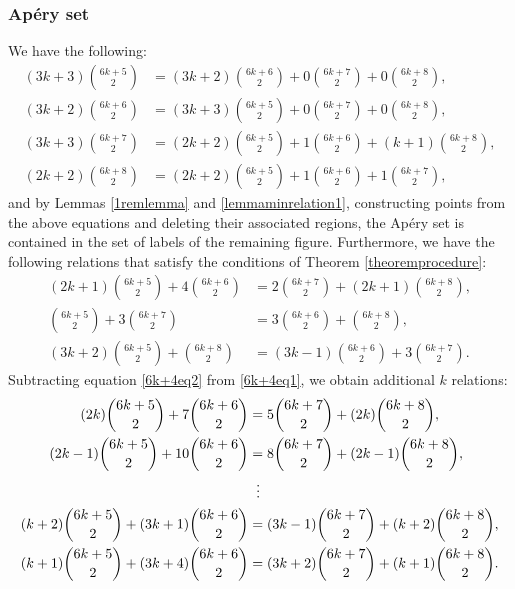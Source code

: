 \documentclass[12pt]{article}
\theoremstyle{remark}
\begin{document}
\subsubsection{Ap{\'e}ry set}
We have the following:
\begin{align}
    (3k+3)\binom{6k+5}{2} &= (3k+2)\binom{6k+6}{2} + 0\binom{6k+7}{2} + 0\binom{6k+8}{2}, \label{6k+4minrelation0} \\
    (3k+2)\binom{6k+6}{2} &= (3k+3)\binom{6k+5}{2} + 0\binom{6k+7}{2} + 0\binom{6k+8}{2}, \label{6k+4minrelation1} \\
    (3k+3)\binom{6k+7}{2} &= (2k+2)\binom{6k+5}{2} + 1\binom{6k+6}{2} + (k+1)\binom{6k+8}{2}, \label{6k+4minrelation2} \\
    (2k+2)\binom{6k+8}{2} &= (2k+2)\binom{6k+5}{2} + 1\binom{6k+6}{2} + 1\binom{6k+7}{2}, \label{6k+4minrelation3} 
\end{align}
and by Lemmas \ref{1remlemma} and \ref{lemmaminrelation1}, constructing points from the above equations and deleting their associated regions, the Ap{\'e}ry set is contained in the set of labels of the remaining figure.
Furthermore, we have the following relations that satisfy the conditions of Theorem \ref{theoremprocedure}:
\begin{align}
    (2k+1) \binom{6k+5}{2} + 4 \binom{6k+6}{2} &= 2\binom{6k+7}{2} + (2k+1)\binom{6k+8}{2}, \label{6k+4eq1}\\
   \binom{6k+5}{2} + 3 \binom{6k+7}{2} &= 3\binom{6k+6}{2} + \binom{6k+8}{2}, \label{6k+4eq2}\\
   (3k+2)\binom{6k+5}{2} +  \binom{6k+8}{2} &= (3k-1)\binom{6k+6}{2} + 3\binom{6k+7}{2} . \label{6k+4eq3}
\end{align}
Subtracting equation \eqref{6k+4eq2} from \eqref{6k+4eq1}, we obtain additional $k$ relations:
\begin{equation}\label{6k+4_kequations_1}
\begin{aligned}    
(2k) \binom{6k+5}{2} + 7 \binom{6k+6}{2} &= 5\binom{6k+7}{2} + (2k)\binom{6k+8}{2},\\
(2k-1) \binom{6k+5}{2} + 10 \binom{6k+6}{2} &= 8\binom{6k+7}{2} + (2k-1)\binom{6k+8}{2},\\
 & \hspace{5.6pt}  \vdots      \\
(k+2) \binom{6k+5}{2} + (3k+1) \binom{6k+6}{2} &= (3k-1)\binom{6k+7}{2} + (k+2)\binom{6k+8}{2}, \\
(k+1) \binom{6k+5}{2} + (3k+4) \binom{6k+6}{2} &= (3k+2)\binom{6k+7}{2} + (k+1)\binom{6k+8}{2}.
\end{aligned}
\end{equation}
\end{document}
